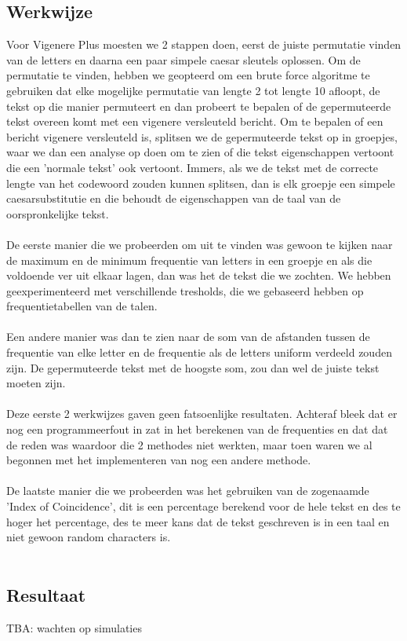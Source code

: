 \documentclass{article}
\begin{document}
\subsection{Werkwijze}
Voor Vigenere Plus moesten we 2 stappen doen, eerst de juiste permutatie vinden van de letters en daarna een paar simpele caesar sleutels oplossen. Om de permutatie te vinden, hebben we geopteerd om een brute force algoritme te gebruiken dat elke mogelijke permutatie van lengte 2 tot lengte 10 afloopt, de tekst op die manier permuteert en dan probeert te bepalen of de gepermuteerde tekst overeen komt met een vigenere versleuteld bericht. Om te bepalen of een bericht vigenere versleuteld is, splitsen we de gepermuteerde tekst op in groepjes, waar we dan een analyse op doen om te zien of die tekst eigenschappen vertoont die een 'normale tekst' ook vertoont. Immers, als we de tekst met de correcte lengte van het codewoord zouden kunnen splitsen, dan is elk groepje een simpele caesarsubstitutie en die behoudt de eigenschappen van de taal van de oorspronkelijke tekst. \\ \\
De eerste manier die we probeerden om uit te vinden was gewoon te kijken naar de maximum en de minimum frequentie van letters in een groepje en als die voldoende ver uit elkaar lagen, dan was het de tekst die we zochten. We hebben geexperimenteerd met verschillende tresholds, die we gebaseerd hebben op frequentietabellen van de talen. \\ \\
Een andere manier was dan te zien naar de som van de afstanden tussen de frequentie van elke letter en de frequentie als de letters uniform verdeeld zouden zijn. De gepermuteerde tekst met de hoogste som, zou dan wel de juiste tekst moeten zijn. \\ \\
Deze eerste 2 werkwijzes gaven geen fatsoenlijke resultaten. Achteraf bleek dat er nog een programmeerfout in zat in het berekenen van de frequenties en dat dat de reden was waardoor die 2 methodes niet werkten, maar toen waren we al begonnen met het implementeren van nog een andere methode. \\ \\
De laatste manier die we probeerden was het gebruiken van de zogenaamde 'Index of Coincidence', dit is een percentage berekend voor de hele tekst en des te hoger het percentage, des te meer kans dat de tekst geschreven is in een taal en niet gewoon random characters is. \\ \\

\subsection{Resultaat}
TBA: wachten op simulaties
\end{document}
